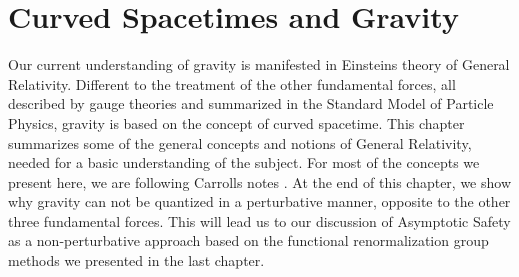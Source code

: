 \chapter{Curved Spacetimes and Gravity}
Our current understanding of gravity is manifested in Einsteins theory of General Relativity. Different to the treatment of the other fundamental forces, all described by gauge theories and summarized in the Standard Model of Particle Physics, gravity is based on the concept of curved spacetime. This chapter summarizes some of the general concepts and notions of General Relativity, needed for a basic understanding of the subject. For most of the concepts we present here, we are following Carrolls notes \cite{CarrollGR}. At the end of this chapter, we show why gravity can not be quantized in a perturbative manner, opposite to the other three fundamental forces. This will lead us to our discussion of Asymptotic Safety as a non-perturbative approach based on the functional renormalization group methods we presented in the last chapter.  

